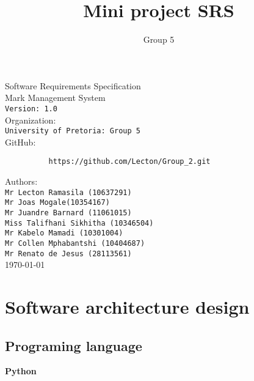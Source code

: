 \documentclass[10pt,a4paper]{article}
\author{Group 5}
\title{Mini project SRS}
\begin{document}
\begin{titlepage}
\begin{center}

\huge Software Requirements Specification\\[0.15cm]
\huge Mark Management System\\[0.15cm]
\large \texttt{Version: 1.0}\\[1cm]

Organization:\\
\texttt{University of Pretoria: Group 5}\\[0.5cm]
GitHub:\\[0.01cm]
\begin{verbatim}
          https://github.com/Lecton/Group_2.git
\end{verbatim}

Authors:\\
\texttt{Mr Lecton Ramasila (10637291)\\
        Mr Joas Mogale(10354167)\\
        Mr Juandre Barnard  (11061015)\\
        Miss Talifhani Sikhitha (10346504)\\
        Mr Kabelo Mamadi (10301004)\\
        Mr Collen Mphabantshi (10404687)\\
        Mr Renato de Jesus (28113561)}\\[1cm]
        
\today
\end{center}
\end{titlepage}


\tableofcontents
\pagebreak
\section{Software architecture design}

\subsection{Programing language}
\textbf{Python}
\end{document}
